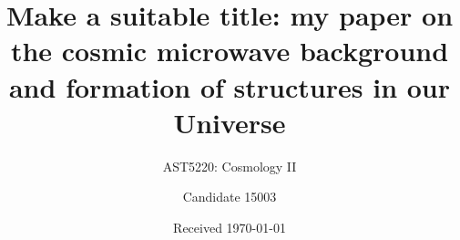 \documentclass[a4paper]{aa} %
\begin{document}
 


   \title{Make a suitable title: my paper on the cosmic microwave background and formation of structures in our Universe}

   \subtitle{AST5220: Cosmology II}

   \author{Candidate 15003
          }


   \date{Received \today}





%
%


%







\end{document}
